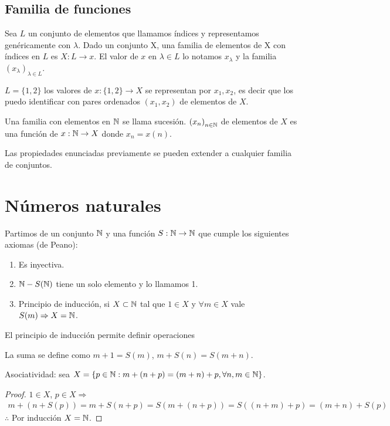 \subsection{Familia de funciones}

Sea \(L\) un conjunto de elementos que llamamos índices y representamos genéricamente con \(\lambda \). Dado un conjunto X, una familia de elementos de X con índices en \(L\) es \(X: L \to x\).
El valor de \(x\) en \(\lambda \in L\) lo notamos \(x_\lambda \) y la familia \({(x_\lambda)}_{\lambda \in L} \).

\begin{eg}
    \(L = \{ 1, 2 \} \) los valores de \(x: \{1, 2\} \to X\) se representan por \(x_1, x_2\), es decir que los puedo identificar con pares ordenados \((x_1, x_2)\) de elementos de \(X\).
\end{eg}

Una familia con elementos en \(\mathbb{N} \) se llama sucesión. \({(x_n)}_{n \in \mathbb{N}} \) de elementos de \(X\) es una función de \(x: \mathbb{N} \to X\) donde \(x_n = x(n)\).

Las propiedades enunciadas previamente se pueden extender a cualquier familia de conjuntos.

\section{Números naturales}

Partimos de un conjunto \(\mathbb{N} \) y una función \(S: \mathbb{N} \to \mathbb{N} \) que cumple los siguientes axiomas (de Peano):
\begin{enumerate}
    \item Es inyectiva.
    \item \(\mathbb{N} - S(\mathbb{N})\) tiene un solo elemento y lo llamamos 1.
    \item Principio de inducción, si \(X \subset \mathbb{N} \) tal que \(1 \in X\) y \(\forall m \in X\) vale \(S(m) \Rightarrow X = \mathbb{N} \).
\end{enumerate}

El principio de inducción permite definir operaciones

La suma se define como \(m+1 = S(m)\), \(m+S(n) = S(m+n)\).

\begin{prop}
    Asociatividad: sea \(X = \{ p \in \mathbb{N} : m+(n+p) = (m+n) +p, \forall n,m \in \mathbb{N} \} \).
    \begin{proof}
        \(1 \in X\), \(p \in X \Rightarrow \) \begin{align*}
            m + (n+S(p)) = m + S(n+p) = S(m +(n+p)) = S((n+m)+p) = (m+n) + S(p)
        \end{align*}
        \(\therefore \) Por inducción \(X = \mathbb{N} \).
    \end{proof}
\end{prop}


